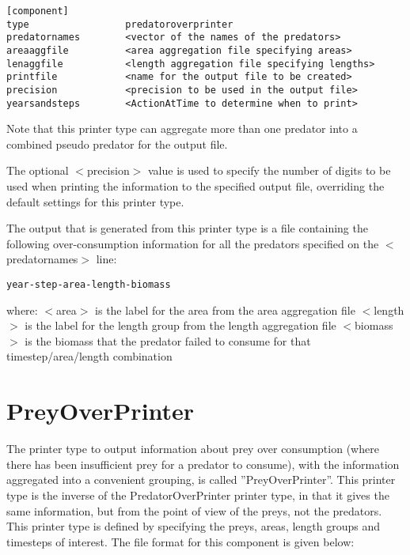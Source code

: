 \documentclass[10pt,twoside]{book}
\begin{document}
{\small\begin{verbatim}
[component]
type                 predatoroverprinter
predatornames        <vector of the names of the predators>
areaaggfile          <area aggregation file specifying areas>
lenaggfile           <length aggregation file specifying lengths>
printfile            <name for the output file to be created>
precision            <precision to be used in the output file>
yearsandsteps        <ActionAtTime to determine when to print>
\end{verbatim}}

Note that this printer type can aggregate more than one predator into a combined pseudo predator for the output file.

\bigskip
The optional $<$precision$>$ value is used to specify the number of digits to be used when printing the information to the specified output file, overriding the default settings for this printer type.

\bigskip
The output that is generated from this printer type is a file containing the following over-consumption information for all the predators specified on the $<$predatornames$>$ line:

{\small\begin{verbatim}
year-step-area-length-biomass
\end{verbatim}}

where:\newline
$<$area$>$ is the label for the area from the area aggregation file\newline
$<$length$>$ is the label for the length group from the length aggregation file\newline
$<$biomass$>$ is the biomass that the predator failed to consume for that timestep/area/length combination

\section{PreyOverPrinter}\label{sec:preyoverprinter}
The printer type to output information about prey over consumption (where there has been insufficient prey for a predator to consume), with the information aggregated into a convenient grouping, is called ''PreyOverPrinter''.  This printer type is the inverse of the PredatorOverPrinter printer type, in that it gives the same information, but from the point of view of the preys, not the predators.  This printer type is defined by specifying the preys, areas, length groups and timesteps of interest.  The file format for this component is given below:
\end{document}
